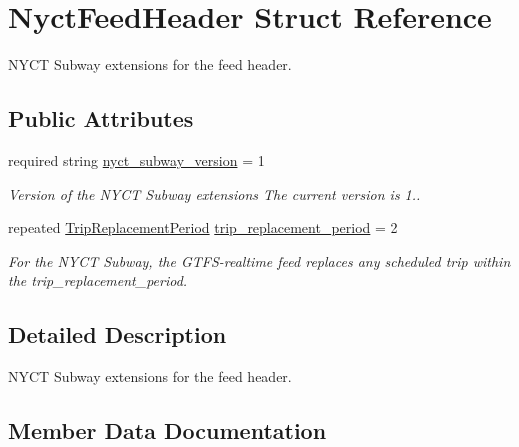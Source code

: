 \hypertarget{structNyctFeedHeader}{}\section{Nyct\+Feed\+Header Struct Reference}
\label{structNyctFeedHeader}


N\+Y\+CT Subway extensions for the feed header.  


\subsection*{Public Attributes}
\begin{DoxyCompactItemize}
\item 
required string \hyperlink{structNyctFeedHeader_a0e0e7f217e725adff3bfcb697db15fe8}{nyct\+\_\+subway\+\_\+version} = 1\hypertarget{structNyctFeedHeader_a0e0e7f217e725adff3bfcb697db15fe8}{}\label{structNyctFeedHeader_a0e0e7f217e725adff3bfcb697db15fe8}

\begin{DoxyCompactList}\small\item\em Version of the N\+Y\+CT Subway extensions The current version is 1.. \end{DoxyCompactList}\item 
repeated \hyperlink{structTripReplacementPeriod}{Trip\+Replacement\+Period} \hyperlink{structNyctFeedHeader_a941bcc94efc50c96134a7702185bd509}{trip\+\_\+replacement\+\_\+period} = 2
\begin{DoxyCompactList}\small\item\em For the N\+Y\+CT Subway, the G\+T\+F\+S-\/realtime feed replaces any scheduled trip within the trip\+\_\+replacement\+\_\+period. \end{DoxyCompactList}\end{DoxyCompactItemize}


\subsection{Detailed Description}
N\+Y\+CT Subway extensions for the feed header. 

\subsection{Member Data Documentation}
